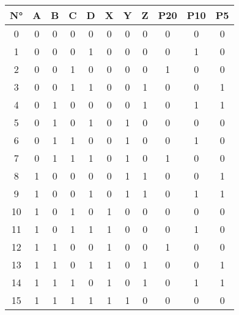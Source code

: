 \begin{enumerate}
\begin{tabular}{|c|c|c|c|c||c|c|c|c|c|c|}
        N° &A & B & C & D & X & Y & Z & P20 & P10 & P5\\ \midrule
0 & 0 & 0 & 0 & 0 & 0 & 0 & 0 & 0 & 0 & 0\\
1 & 0 & 0 & 0 & 1 & 0 & 0 & 0 & 0 & 1 & 0\\
2 & 0 & 0 & 1 & 0 & 0 & 0 & 0 & 1 & 0 & 0\\
3 & 0 & 0 & 1 & 1 & 0 & 0 & 1 & 0 & 0 & 1\\
\midrule
4 & 0 & 1 & 0 & 0 & 0 & 0 & 1 & 0 & 1 & 1\\
5 & 0 & 1 & 0 & 1 & 0 & 1 & 0 & 0 & 0 & 0\\
6 & 0 & 1 & 1 & 0 & 0 & 1 & 0 & 0 & 1 & 0\\
7 & 0 & 1 & 1 & 1 & 0 & 1 & 0 & 1 & 0 & 0\\
\midrule
8 & 1 & 0 & 0 & 0 & 0 & 1 & 1 & 0 & 0 & 1\\
9 & 1 & 0 & 0 & 1 & 0 & 1 & 1 & 0 & 1 & 1\\
10 & 1 & 0 & 1 & 0 & 1 & 0 & 0 & 0 & 0 & 0\\
11 & 1 & 0 & 1 & 1 & 1 & 0 & 0 & 0 & 1 & 0\\
\midrule
12 & 1 & 1 & 0 & 0 & 1 & 0 & 0 & 1 & 0 & 0\\
13 & 1 & 1 & 0 & 1 & 1 & 0 & 1 & 0 & 0 & 1\\
14 & 1 & 1 & 1 & 0 & 1 & 0 & 1 & 0 & 1 & 1\\
15 & 1 & 1 & 1 & 1 & 1 & 1 & 0 & 0 & 0 & 0\\
\bottomrule

        \end{tabular}



\end{enumerate}
